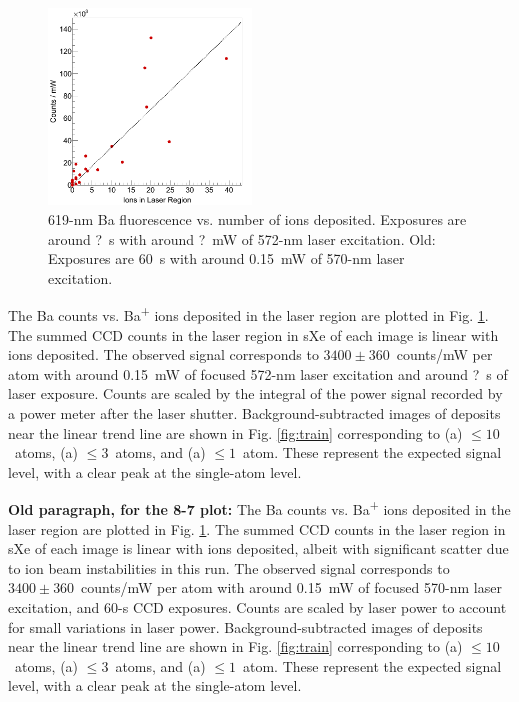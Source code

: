 \documentclass[aps,pra,reprint,superscriptaddress]{revtex4-1}
\begin{document}
\begin{figure}
\includegraphics[width=0.48\textwidth]{figures/lin_just20150807_lin.png}
\caption{619-nm Ba fluorescence vs. number of ions deposited.  Exposures are around {\color{gray}?}~s with around {\color{gray}?}~mW of 572-nm laser excitation. {\color{gray}Old: Exposures are 60~s with around 0.15~mW of 570-nm laser excitation.}}
\label{fig:ctsVsIons}
\end{figure}

The Ba counts vs. Ba\textsuperscript{+} ions deposited in the laser region are plotted in Fig. \ref{fig:ctsVsIons}.  The summed CCD counts in the laser region in sXe of each image is linear with ions deposited.  The observed signal corresponds to {\color{gray}$3400 \pm 360$}~counts/mW per atom with around {\color{gray}0.15~mW} of focused 572-nm laser excitation and around {\color{gray}?}~s of laser exposure.  Counts are scaled by the integral of the power signal recorded by a power meter after the laser shutter.  Background-subtracted images of deposits near the linear trend line are shown in Fig. \ref{fig:train} corresponding to {\color{gray}(a) $\leq 10$~atoms, (a) $\leq 3$~atoms, and (a) $\leq 1$~atom}.  These represent the expected signal level, with a clear peak at the single-atom level.

{\color{gray}\textbf{Old paragraph, for the 8-7 plot:}  The Ba counts vs. Ba\textsuperscript{+} ions deposited in the laser region are plotted in Fig. \ref{fig:ctsVsIons}.  The summed CCD counts in the laser region in sXe of each image is linear with ions deposited{\color{gray}, albeit with significant scatter due to ion beam instabilities in this run}.  The observed signal corresponds to $3400 \pm 360$~counts/mW per atom with around {\color{gray}0.15~mW} of focused 570-nm laser excitation, and 60-s CCD exposures.  Counts are scaled by laser power to account for small variations in laser power.  Background-subtracted images of deposits near the linear trend line are shown in Fig. \ref{fig:train} corresponding to (a) $\leq 10$~atoms, (a) $\leq 3$~atoms, and (a) $\leq 1$~atom.  These represent the expected signal level, with a clear peak at the single-atom level.}
\end{document}
